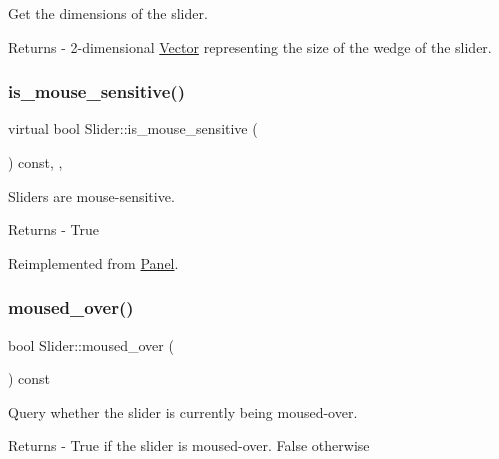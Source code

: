 Get the dimensions of the slider. \begin{DoxyReturn}{Returns}
-\/ 2-\/dimensional \mbox{\hyperlink{class_vector}{Vector}} representing the size of the wedge of the slider. 
\end{DoxyReturn}
\mbox{\label{class_slider_a8d7d12aa4bc5d26de46790b43116bcc1}} 
\subsubsection{\texorpdfstring{is\+\_\+mouse\+\_\+sensitive()}{is\_mouse\_sensitive()}}
{\footnotesize\ttfamily virtual bool Slider\+::is\+\_\+mouse\+\_\+sensitive (\begin{DoxyParamCaption}{ }\end{DoxyParamCaption}) const\hspace{0.3cm}{\ttfamily [inline]}, {\ttfamily [override]}, {\ttfamily [virtual]}}

Sliders are mouse-\/sensitive. \begin{DoxyReturn}{Returns}
-\/ True 
\end{DoxyReturn}


Reimplemented from \mbox{\hyperlink{class_panel_a607fe6e1be6fd056f199fa817a4dedda}{Panel}}.

\mbox{\label{class_slider_a736d0f12de097fa94f1b1b718f4f76a7}} 
\subsubsection{\texorpdfstring{moused\+\_\+over()}{moused\_over()}}
{\footnotesize\ttfamily bool Slider\+::moused\+\_\+over (\begin{DoxyParamCaption}{ }\end{DoxyParamCaption}) const}

Query whether the slider is currently being moused-\/over. \begin{DoxyReturn}{Returns}
-\/ True if the slider is moused-\/over. False otherwise 
\end{DoxyReturn}
\mbox{\label{class_slider_a4ebd527db54ea263c7d0efe4d1f94e1b}} 
